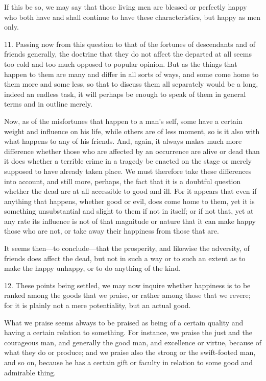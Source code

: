 If this be so, we may say that those living men are blessed or
perfectly happy who both have and shall continue to have these
characteristics, but happy as men only.

11. Passing now from this question to that of the fortunes of
descendants and of friends generally, the doctrine that they do not
affect the departed at all seems too cold and too much opposed to
popular opinion. But as the things that happen to them are many and
differ in all sorts of ways, and some come home to them more and some
less, so that to discuss them all separately would be a long, indeed
an endless task, it will perhaps be enough to speak of them in general
terms and in outline merely.

Now, as of the misfortunes that happen to a man's self, some have a
certain weight and influence on his life, while others are of less
moment, so is it also with  what happens to any of his
friends. And, again, it always makes much more difference whether
those who are affected by an occurrence are alive or dead than it does
whether a terrible crime in a tragedy be enacted on the stage or
merely supposed to have already taken place. We must therefore take
these differences into account, and still more, perhaps, the fact that
it is a doubtful question whether the dead are at all accessible to
good and ill. For it appears that even if anything that happens,
whether good or evil, does come home to them, yet it is something
unsubstantial and slight to them if not in itself; or if not that, yet
at any rate its influence is not of that magnitude or nature that it
can make happy those who are not, or take away their happiness from
those that are.

It seems then---to conclude---that the prosperity, and likewise the
adversity, of friends does affect the dead, but not in such a way or
to such an extent as to make the happy unhappy, or to do anything of
the kind.

12. These points being settled, we may now inquire whether happiness
is to be ranked among the goods that we praise, or rather among those
that we revere; for it is plainly not a mere potentiality, but an
actual good.

What we praise seems always to be praised as being of a certain
quality and having a certain relation to something. For instance, we
praise the just and the courageous man, and generally the good man,
and excellence or virtue, because of what they do or produce; and we
praise also the strong or the swift-footed man, and so on,
because he has a certain gift or faculty in relation to some good and
admirable thing.

